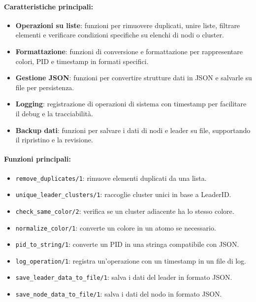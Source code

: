\documentclass[12pt, a4paper]{report}
\begin{document}
\paragraph{Caratteristiche principali:}
\begin{itemize}
    \item \textbf{Operazioni su liste}: funzioni per rimuovere duplicati, unire liste, filtrare elementi e verificare condizioni specifiche su elenchi di nodi o cluster.
    \item \textbf{Formattazione}: funzioni di conversione e formattazione per rappresentare colori, PID e timestamp in formati specifici.
    \item \textbf{Gestione JSON}: funzioni per convertire strutture dati in JSON e salvarle su file per persistenza.
    \item \textbf{Logging}: registrazione di operazioni di sistema con timestamp per facilitare il debug e la tracciabilità.
    \item \textbf{Backup dati}: funzioni per salvare i dati di nodi e leader su file, supportando il ripristino e la revisione.
\end{itemize}

\paragraph{Funzioni principali:}
\begin{itemize}
    \item \texttt{remove\_duplicates/1}: rimuove elementi duplicati da una lista.
    \item \texttt{unique\_leader\_clusters/1}: raccoglie cluster unici in base a LeaderID.
    \item \texttt{check\_same\_color/2}: verifica se un cluster adiacente ha lo stesso colore.
    \item \texttt{normalize\_color/1}: converte un colore in un atomo se necessario.
    \item \texttt{pid\_to\_string/1}: converte un PID in una stringa compatibile con JSON.
    \item \texttt{log\_operation/1}: registra un'operazione con un timestamp in un file di log.
    \item \texttt{save\_leader\_data\_to\_file/1}: salva i dati del leader in formato JSON.
    \item \texttt{save\_node\_data\_to\_file/1}: salva i dati del nodo in formato JSON.
\end{itemize}
\end{document}
